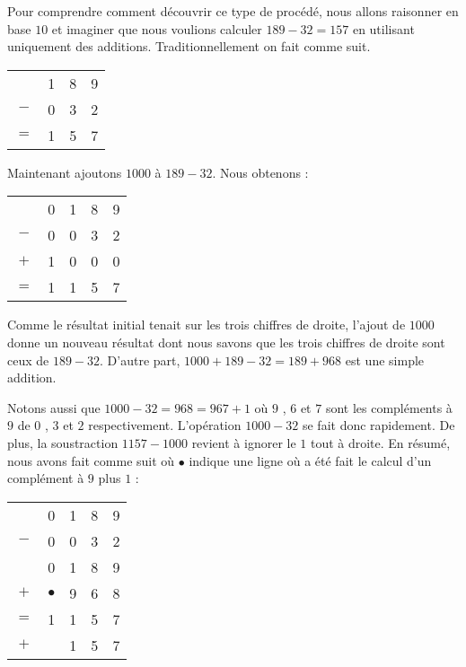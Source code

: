 Pour comprendre comment découvrir ce type de procédé, nous allons raisonner en base $10$ et imaginer que nous voulions calculer $189 - 32 = 157$ en utilisant uniquement des additions. Traditionnellement on fait comme suit.
\begin{center}
\begin{tabular}{cccc}
	    & 1 & 8 & 9 \\
	$-$ & 0 & 3 & 2 \\
	\hline
    $=$ & 1 & 5 & 7 \\
\end{tabular}
\end{center}
Maintenant ajoutons $1000$ à $189 - 32$. Nous obtenons :
\begin{center}
\begin{tabular}{ccccc}
	    & 0 & 1 & 8 & 9 \\
	$-$ & 0 & 0 & 3 & 2 \\
	$+$ & 1 & 0 & 0 & 0 \\
	\hline
    $=$ & 1 & 1 & 5 & 7 \\
\end{tabular}
\end{center}
Comme le résultat initial tenait sur les trois chiffres de droite, l'ajout de $1000$ donne un nouveau résultat dont nous savons que les trois chiffres de droite sont ceux de $189 - 32$.
D'autre part, $1000 + 189 - 32 = 189 + 968$ est une simple addition.

\smallskip

Notons aussi que $1000 - 32 = 968 = 967 + 1$ où $9$ , $6$ et $7$ sont les compléments à $9$ de $0$ , $3$ et $2$ respectivement.
L'opération $1000 - 32$ se fait donc rapidement. De plus, la soustraction $1157 - 1000$ revient à ignorer le $1$ tout à droite. En résumé, nous avons fait comme suit où $\bullet$ indique une ligne où a été fait le calcul d'un complément à $9$ plus $1$ :

\begin{center}
\begin{tabular}{ccccc}
	    & 0 & 1 & 8 & 9 \\
	$-$ & 0 & 0 & 3 & 2 \\
	\hline
	\hline
	    & 0 & 1 & 8 & 9 \\
	$+$ & $\bullet$ & 9 & 6 & 8 \\
	\hline
    $=$ & 1 & 1 & 5 & 7 \\
	\hline
	\hline
    $+$ &  & 1 & 5 & 7 \\
\end{tabular}
\end{center}

